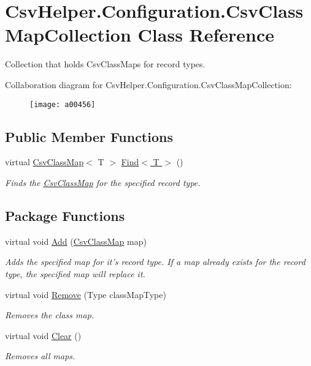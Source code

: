\hypertarget{a00061}{\section{Csv\-Helper.\-Configuration.\-Csv\-Class\-Map\-Collection Class Reference}
\label{a00061}
}


Collection that holds Csv\-Class\-Maps for record types.  




Collaboration diagram for Csv\-Helper.\-Configuration.\-Csv\-Class\-Map\-Collection\-:
\nopagebreak
\begin{figure}[H]
\begin{center}
\leavevmode
\texttt{[image: a00456]}
\end{center}
\end{figure}
\subsection*{Public Member Functions}
\begin{DoxyCompactItemize}
\item 
virtual \hyperlink{a00059}{Csv\-Class\-Map}$<$ T $>$ \hyperlink{a00061_ac75513617b6c256c3d693adf4482e1ed}{Find$<$ T $>$} ()
\begin{DoxyCompactList}\small\item\em Finds the \hyperlink{a00059}{Csv\-Class\-Map} for the specified record type. \end{DoxyCompactList}\end{DoxyCompactItemize}
\subsection*{Package Functions}
\begin{DoxyCompactItemize}
\item 
virtual void \hyperlink{a00061_aab6a14a4c1a614fac511ddd6af2c9e40}{Add} (\hyperlink{a00059}{Csv\-Class\-Map} map)
\begin{DoxyCompactList}\small\item\em Adds the specified map for it's record type. If a map already exists for the record type, the specified map will replace it. \end{DoxyCompactList}\item 
virtual void \hyperlink{a00061_a0b18f7ab62839aa354021986e5a2ef96}{Remove} (Type class\-Map\-Type)
\begin{DoxyCompactList}\small\item\em Removes the class map. \end{DoxyCompactList}\item 
virtual void \hyperlink{a00061_a91718f9b6527a7f833393d24587716cc}{Clear} ()
\begin{DoxyCompactList}\small\item\em Removes all maps. \end{DoxyCompactList}\end{DoxyCompactItemize}
